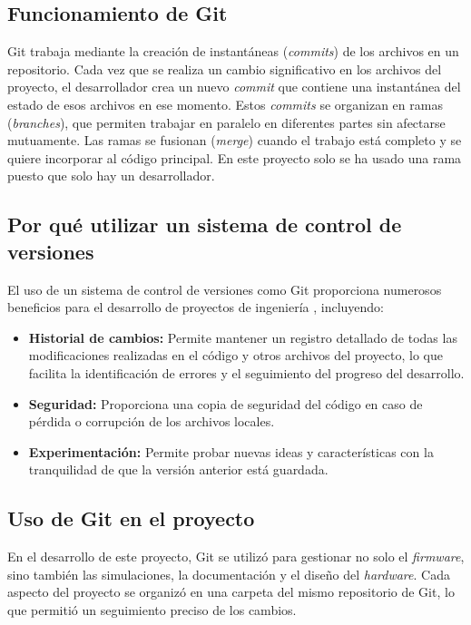 \subsection{Funcionamiento de Git}
Git trabaja mediante la creación de instantáneas (\textit{commits}) de los archivos en un repositorio. Cada vez que se realiza un cambio significativo en los archivos del proyecto, el desarrollador crea un nuevo \textit{commit} que contiene una instantánea del estado de esos archivos en ese momento. Estos \textit{commits} se organizan en ramas (\textit{branches}), que permiten trabajar en paralelo en diferentes partes sin afectarse mutuamente. Las ramas se fusionan (\textit{merge}) cuando el trabajo está completo y se quiere incorporar al código principal. En este proyecto solo se ha usado una rama puesto que solo hay un desarrollador.

\subsection{Por qué utilizar un sistema de control de versiones}
El uso de un sistema de control de versiones como Git proporciona numerosos beneficios para el desarrollo de proyectos de ingeniería \cite{GestionProyectos}, incluyendo:

\begin{itemize}
	\item \textbf{Historial de cambios:} Permite mantener un registro detallado de todas las modificaciones realizadas en el código y otros archivos del proyecto, lo que facilita la identificación de errores y el seguimiento del progreso del desarrollo.
	\item \textbf{Seguridad:} Proporciona una copia de seguridad del código en caso de pérdida o corrupción de los archivos locales.
	\item \textbf{Experimentación:} Permite probar nuevas ideas y características con la tranquilidad de que la versión anterior está guardada.
\end{itemize}

\subsection{Uso de Git en el proyecto}
En el desarrollo de este proyecto, Git se utilizó para gestionar no solo el \textit{firmware}, sino también las simulaciones, la documentación y el diseño del \textit{hardware}. Cada aspecto del proyecto se organizó en una carpeta del mismo repositorio de Git, lo que permitió un seguimiento preciso de los cambios.

